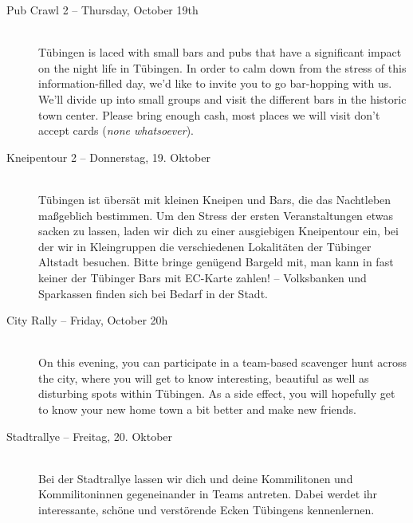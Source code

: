 \begin{description}
\ifml
	\item[Pub Crawl 2 -- Thursday, October 19th \YEAR]~\\%
	Tübingen is laced with small bars and pubs that have a significant impact on the night life in Tübingen.
	In order to calm down from the stress of this information-filled day, we'd like to invite you to go bar-hopping with us.
	We'll divide up into small groups and visit the different bars in the historic town center.
	Please bring enough cash, most places we will visit don't accept cards (\emph{none whatsoever}).
\else
	\item[Kneipentour 2 -- Donnerstag, 19. Oktober \YEAR]~\\%
	Tübingen ist übersät mit kleinen Kneipen und Bars, die das Nachtleben maßgeblich bestimmen.
	Um den Stress der ersten Veranstaltungen etwas sacken zu lassen, laden wir dich zu einer ausgiebigen Kneipentour ein,
	bei der wir in Kleingruppen die verschiedenen Lokalitäten der Tübinger Altstadt besuchen.
	Bitte bringe genügend Bargeld mit, man kann in fast keiner der Tübinger Bars mit EC-Karte zahlen! -- Volksbanken und Sparkassen finden sich bei Bedarf in der Stadt.
\fi

\ifml
	\item[City Rally -- Friday, October 20h \YEAR]~\\%
	On this evening, you can participate in a team-based scavenger hunt across the city,
	where you will get to know interesting, beautiful as well as disturbing spots within Tübingen.
	As a side effect, you will hopefully get to know your new home town a bit better and make new friends.
\else
	\item[Stadtrallye -- Freitag, 20. Oktober \YEAR]~\\%
	Bei der Stadtrallye lassen wir dich und deine Kommilitonen und Kommilitoninnen gegeneinander in Teams antreten.
	Dabei werdet ihr interessante, schöne und verstörende Ecken Tübingens kennenlernen.
\fi

\ifbachelor \pagebreak  \fi


\end{description}
